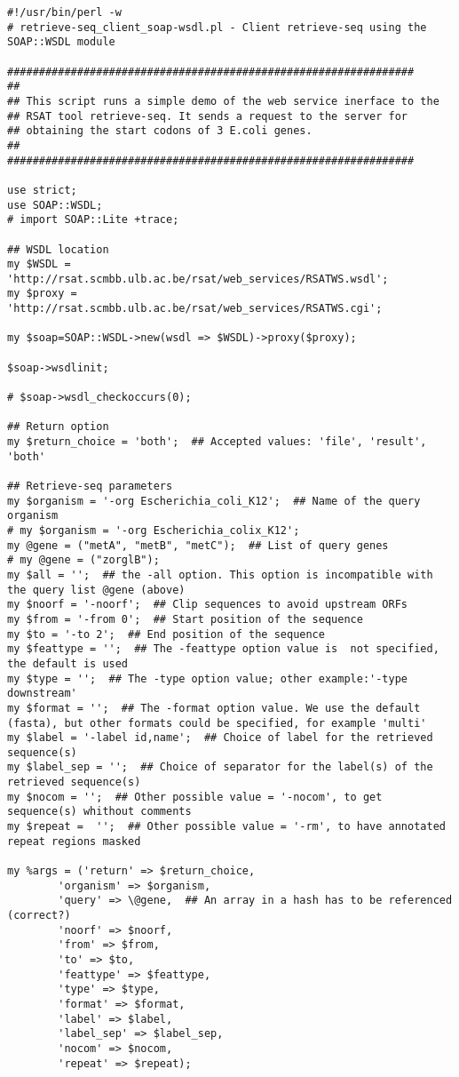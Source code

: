 \begin{footnotesize}
\begin{verbatim}
#!/usr/bin/perl -w
# retrieve-seq_client_soap-wsdl.pl - Client retrieve-seq using the SOAP::WSDL module

################################################################
##
## This script runs a simple demo of the web service inerface to the
## RSAT tool retrieve-seq. It sends a request to the server for
## obtaining the start codons of 3 E.coli genes.
##
################################################################

use strict;
use SOAP::WSDL;
# import SOAP::Lite +trace;

## WSDL location
my $WSDL = 'http://rsat.scmbb.ulb.ac.be/rsat/web_services/RSATWS.wsdl';
my $proxy = 'http://rsat.scmbb.ulb.ac.be/rsat/web_services/RSATWS.cgi';

my $soap=SOAP::WSDL->new(wsdl => $WSDL)->proxy($proxy);

$soap->wsdlinit;

# $soap->wsdl_checkoccurs(0);

## Return option
my $return_choice = 'both';  ## Accepted values: 'file', 'result', 'both'

## Retrieve-seq parameters
my $organism = '-org Escherichia_coli_K12';  ## Name of the query organism
# my $organism = '-org Escherichia_colix_K12';
my @gene = ("metA", "metB", "metC");  ## List of query genes
# my @gene = ("zorglB");
my $all = '';  ## the -all option. This option is incompatible with the query list @gene (above)
my $noorf = '-noorf';  ## Clip sequences to avoid upstream ORFs
my $from = '-from 0';  ## Start position of the sequence
my $to = '-to 2';  ## End position of the sequence
my $feattype = '';  ## The -feattype option value is  not specified, the default is used
my $type = '';  ## The -type option value; other example:'-type downstream'
my $format = '';  ## The -format option value. We use the default (fasta), but other formats could be specified, for example 'multi'
my $label = '-label id,name';  ## Choice of label for the retrieved sequence(s)
my $label_sep = '';  ## Choice of separator for the label(s) of the retrieved sequence(s)
my $nocom = '';  ## Other possible value = '-nocom', to get sequence(s) whithout comments
my $repeat =  '';  ## Other possible value = '-rm', to have annotated repeat regions masked

my %args = ('return' => $return_choice,
	    'organism' => $organism,
	    'query' => \@gene,  ## An array in a hash has to be referenced (correct?)
	    'noorf' => $noorf,
	    'from' => $from,
	    'to' => $to,
	    'feattype' => $feattype,
	    'type' => $type,
	    'format' => $format,
	    'label' => $label,
	    'label_sep' => $label_sep,
	    'nocom' => $nocom,
	    'repeat' => $repeat);


\end{verbatim}
\end{footnotesize}
